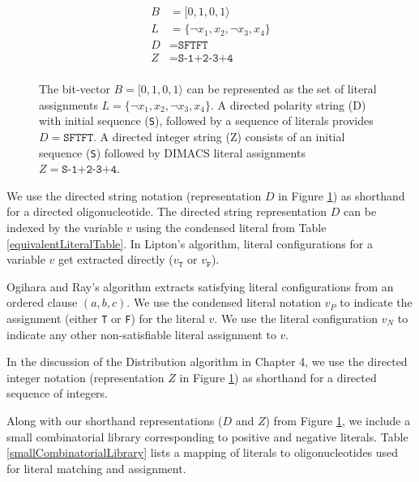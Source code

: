 \begin{figure}[htbp]
\begin{center}

	\begin{align*}
	B &= [0, 1, 0, 1 \rangle \\
	L &= \{ \neg x_1, x_2, \neg x_3, x_4 \} \\
	D &= \texttt{SFTFT}\\ 
	Z &= \texttt{S-1+2-3+4}\\ 
	\end{align*}

\caption{The bit-vector $B = [0, 1, 0, 1 \rangle$ can be represented as the set of literal assignments $L = \{ \neg x_1, x_2, \neg x_3, x_4 \}$.  A directed polarity string (D) with initial sequence (\texttt{S}), followed by a sequence of literals provides $D = \texttt{SFTFT}$.  A directed integer string (Z) consists of an initial sequence (\texttt{S}) followed by DIMACS literal assignments $Z =\texttt{S-1+2-3+4}$. }
\label{equivalentWitnessRepresentations}
\end{center}
\end{figure}

\FloatBarrier

We use the directed string notation (representation $D$ in Figure \ref{equivalentWitnessRepresentations}) as shorthand for a directed oligonucleotide.  The directed string representation $D$ can be indexed by the variable $v$ using the condensed literal from Table \ref{equivalentLiteralTable}.  In Lipton's algorithm, literal configurations for a variable $v$ get extracted directly ($v_{\texttt{T}}$ or $v_{\texttt{F}}$).

Ogihara and Ray's algorithm extracts satisfying literal configurations from an ordered clause $(a, b, c)$.  We use the condensed literal notation $v_P$ to indicate the assignment (either \texttt{T} or \texttt{F}) for the literal $v$.  We use the literal configuration $v_N$ to indicate any other non-satisfiable literal assignment to $v$.

In the discussion of the Distribution algorithm in Chapter 4, we use the directed integer notation (representation $Z$ in Figure \ref{equivalentWitnessRepresentations}) as shorthand for a directed sequence of integers.

Along with our shorthand representations ($D$ and $Z$) from Figure \ref{equivalentWitnessRepresentations}, we include a small combinatorial library corresponding to positive and negative literals.  Table \ref{smallCombinatorialLibrary} lists a mapping of literals to oligonucleotides used for literal matching and assignment.  


